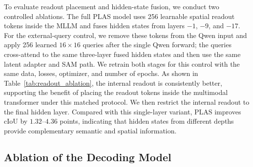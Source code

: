 To evaluate readout placement and hidden-state fusion, we conduct two controlled ablations. The full PLAS model uses 256 learnable spatial readout tokens inside the MLLM and fuses hidden states from layers $-1$, $-9$, and $-17$. For the external-query control, we remove these tokens from the Qwen input and apply 256 learned $16\times16$ queries after the single Qwen forward; the queries cross-attend to the same three-layer fused hidden states and then use the same latent adapter and SAM path. We retrain both stages for this control with the same data, losses, optimizer, and number of epochs. As shown in Table~\ref{tab:readout_ablation}, the internal readout is consistently better, supporting the benefit of placing the readout tokens inside the multimodal transformer under this matched protocol. We then restrict the internal readout to the final hidden layer. Compared with this single-layer variant, PLAS improves cIoU by $1.32$--$4.36$ points, indicating that hidden states from different depths provide complementary semantic and spatial information.


\begin{table}[t]
  \centering
  \scriptsize
  \setlength{\tabcolsep}{1.65pt}
  \renewcommand{\arraystretch}{0.96}
  \caption{Ablation of readout placement and hidden-state fusion. We report cIoU (\%).}
  \label{tab:readout_ablation}
\end{table}


\subsection{Ablation of the Decoding Model}
\label{sec:decoder_ablation}

